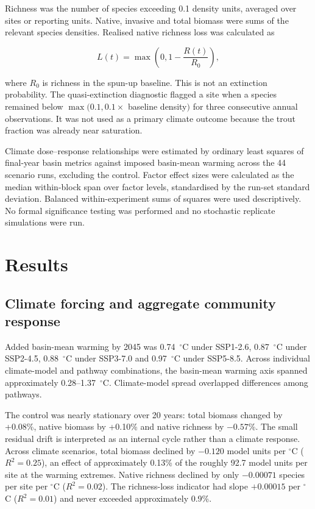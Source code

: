 \documentclass[11pt,a4paper]{article}
\begin{document}
Richness was the number of species exceeding 0.1 density units, averaged over sites or reporting units. Native, invasive and total biomass were sums of the relevant species densities. Realised native richness loss was calculated as

\begin{equation}
L(t)=\max\left(0,1-\frac{R(t)}{R_0}\right),
\end{equation}

where $R_0$ is richness in the spun-up baseline. This is not an extinction probability. The quasi-extinction diagnostic flagged a site when a species remained below $\max(0.1,0.1\times$ baseline density$)$ for three consecutive annual observations. It was not used as a primary climate outcome because the trout fraction was already near saturation.

Climate dose--response relationships were estimated by ordinary least squares of final-year basin metrics against imposed basin-mean warming across the 44 scenario runs, excluding the control. Factor effect sizes were calculated as the median within-block span over factor levels, standardised by the run-set standard deviation. Balanced within-experiment sums of squares were used descriptively. No formal significance testing was performed and no stochastic replicate simulations were run.

\section{Results}

\subsection{Climate forcing and aggregate community response}

Added basin-mean warming by 2045 was 0.74~$^\circ$C under SSP1-2.6, 0.87~$^\circ$C under SSP2-4.5, 0.88~$^\circ$C under SSP3-7.0 and 0.97~$^\circ$C under SSP5-8.5. Across individual climate-model and pathway combinations, the basin-mean warming axis spanned approximately 0.28--1.37~$^\circ$C. Climate-model spread overlapped differences among pathways.

The control was nearly stationary over 20 years: total biomass changed by +0.08\%, native biomass by +0.10\% and native richness by $-0.57$\%. The small residual drift is interpreted as an internal cycle rather than a climate response. Across climate scenarios, total biomass declined by $-0.120$ model units per $^\circ$C ($R^2=0.25$), an effect of approximately 0.13\% of the roughly 92.7 model units per site at the warming extremes. Native richness declined by only $-0.00071$ species per site per $^\circ$C ($R^2=0.02$). The richness-loss indicator had slope $+0.00015$ per $^\circ$C ($R^2=0.01$) and never exceeded approximately 0.9\%.
\end{document}
